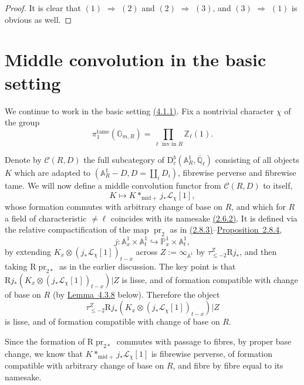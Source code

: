 \begin{proof}
It is clear that \((1)\) \(\Rightarrow\) \((2)\) and \((2)\) \(\Rightarrow\) \((3)\), and
\((3)\) \(\Rightarrow\) \((1)\) is obvious as well.
\end{proof}

\section{Middle convolution in the basic setting}\label{sec:4.3}

We continue to work in the basic setting \hyperref[par:4.1.1]{(4.1.1)}. Fix a
nontrivial character \(\chi\) of the group
\[
  \pi_1^{\mathrm{tame}}(\mathbb{G}_{m,R})
  =
  \prod_{\ell\text{ inv in }R}\mathbb{Z}_\ell(1).
\]

Denote by \(\mathcal{C}(R,D)\) the full subcategory of
\(\mathrm{D}^b_c(\mathbb{A}^1_R,\overline{\mathbb{Q}}_\ell)\) consisting of
all objects \(K\) which are adapted to
\((\mathbb{A}^1_R-D,D=\coprod_iD_i)\), fibrewise perverse and fibrewise tame.
We will now define a middle convolution functor from \(\mathcal{C}(R,D)\) to
itself,
\[
  K\longmapsto K*_{\mathrm{mid}+}j_*\mathcal{L}_\chi[1],
\]
whose formation commutes with arbitrary change of base on \(R\), and which for
\(R\) a field of characteristic \(\ne\ell\) coincides with its namesake
\hyperref[par:2.6.2]{(2.6.2)}. It is defined via the relative compactification
of the map \(\operatorname{pr}_2\) as in
\hyperref[par:2.8.3]{(2.8.3)}--\hyperref[prop:2.8.4]{Proposition~2.8.4},
\[
  j:\mathbb{A}^1_x\times\mathbb{A}^1_t
  \hookrightarrow
  \mathbb{P}^1_x\times\mathbb{A}^1_t,
\]
by extending \(K_x\otimes(j_*\mathcal{L}_\chi[1])_{t-x}\) across
\(Z:=\infty_{\mathbb{A}^1}\) by
\(\tau^Z_{\leq -2}\mathrm{R}j_*\), \cite[1.4.13]{BBD} and then taking
\(\mathrm{R}\operatorname{pr}_{2*}\) as in the earlier discussion. The key
point is that
\(\mathrm{R}j_*(K_x\otimes(j_*\mathcal{L}_\chi[1])_{t-x})\vert Z\) is lisse,
and of formation compatible with change of base on \(R\) (by
\hyperref[lem:4.3.8]{Lemma~4.3.8} below). Therefore the object
\[
  \tau^Z_{\leq -2}
  \mathrm{R}j_*(K_x\otimes(j_*\mathcal{L}_\chi[1])_{t-x})\vert Z
\]
is lisse, and of formation compatible with change of base on \(R\).

Since the formation of \(\mathrm{R}\operatorname{pr}_{2*}\) commutes with
passage to fibres, by proper base change, we know that
\(K*_{\mathrm{mid}+}j_*\mathcal{L}_\chi[1]\) is fibrewise perverse, of
formation compatible with arbitrary change of base on \(R\), and fibre by
fibre equal to its namesake.

